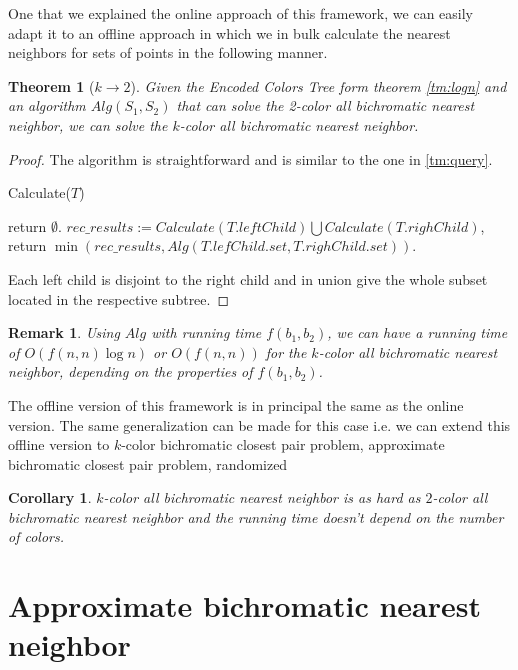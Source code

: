\documentclass{article}
\newtheorem{theorem}{Theorem}
\newtheorem{corollary}{Corollary}
\newtheorem{remark}{Remark}
\newtheorem{proof}{Proof}
\begin{document}
One that we explained the online approach of this framework, we can easily adapt it to an offline approach in which we in bulk calculate the nearest neighbors for sets of points in the following manner.

\begin{theorem}[$k\to 2$]\label{tm:k2color}
Given the Encoded Colors Tree form theorem \ref{tm:logn} and an algorithm $Alg(S_1, S_2)$ that can solve the 2-color all bichromatic nearest neighbor, we can solve the $k$-color all bichromatic nearest neighbor.
\end{theorem}
\begin{proof}
The algorithm is straightforward and is similar to the one in \ref{tm:query}.
\begin{algorithm}
\caption{Calculate($T$)}\label{alg:k2color}
\begin{algorithmic}
    \State return $\emptyset$.
    \Else
    \State $rec\_results := Calculate(T.leftChild) \bigcup Calculate(T.righChild)$,
    \State return $\min\left(rec\_results, Alg\left(T.lefChild.set, T.righChild.set\right)\right)$.
    \EndIf
\end{algorithmic}
\end{algorithm}
Each left child is disjoint to the right child and in union give the whole subset located in the respective subtree.
\end{proof}
\begin{remark}
Using $Alg$ with running time $f(b_1,b_2)$, we can have a running time of $O(f(n,n)\log n)$ or $O(f(n,n))$ for the $k$-color all bichromatic nearest neighbor, depending on the properties of $f(b_1,b_2)$.
\end{remark}
The offline version of this framework is in principal the same as the online version.
The same generalization can be made for this case i.e. we can extend this offline version to $k$-color bichromatic closest pair problem, approximate bichromatic closest pair problem, randomized

\begin{corollary}
$k$-color all bichromatic nearest neighbor is as hard as $2$-color all bichromatic nearest neighbor and the running time doesn't depend on the number of colors.
\end{corollary}

\section*{Approximate bichromatic nearest neighbor }
\end{document}
